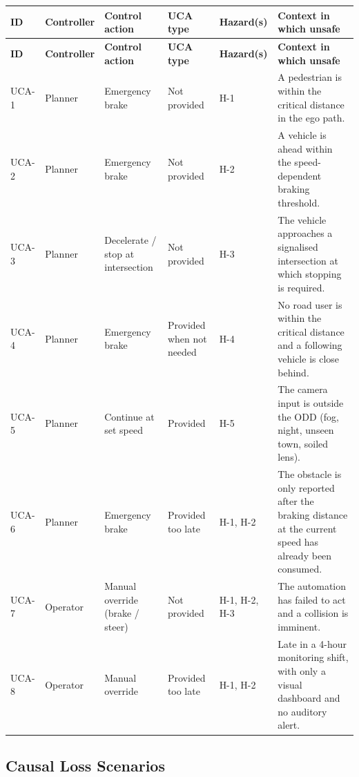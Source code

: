 \documentclass[a4paper,12pt]{article}
\begin{document}
{\footnotesize
\begin{longtable}{@{}P{1.0cm}P{2.0cm}P{1.9cm}P{1.6cm}P{1.8cm}P{5.5cm}@{}}
\toprule
\textbf{ID} & \textbf{Controller} & \textbf{Control action} & \textbf{UCA type} & \textbf{Hazard(s)} & \textbf{Context in which unsafe} \\
\midrule
\endfirsthead
\toprule
\textbf{ID} & \textbf{Controller} & \textbf{Control action} & \textbf{UCA type} & \textbf{Hazard(s)} & \textbf{Context in which unsafe} \\
\midrule
\endhead
\bottomrule
\endlastfoot
UCA-1 & Planner & Emergency brake & Not provided & H-1
      & A pedestrian is within the critical distance in the ego path. \\
UCA-2 & Planner & Emergency brake & Not provided & H-2
      & A vehicle is ahead within the speed-dependent braking threshold. \\
UCA-3 & Planner & Decelerate / stop at intersection & Not provided & H-3
      & The vehicle approaches a signalised intersection at which stopping is required. \\
UCA-4 & Planner & Emergency brake & Provided when not needed & H-4
      & No road user is within the critical distance and a following vehicle is close
        behind. \\
UCA-5 & Planner & Continue at set speed & Provided & H-5
      & The camera input is outside the ODD (fog, night, unseen town, soiled lens). \\
UCA-6 & Planner & Emergency brake & Provided too late & H-1, H-2
      & The obstacle is only reported after the braking distance at the current speed has
        already been consumed. \\
UCA-7 & Operator & Manual override (brake / steer) & Not provided & H-1, H-2, H-3
      & The automation has failed to act and a collision is imminent. \\
UCA-8 & Operator & Manual override & Provided too late & H-1, H-2
      & Late in a 4-hour monitoring shift, with only a visual dashboard and no auditory
        alert. \\
\end{longtable}}

\subsection{Causal Loss Scenarios}
\end{document}
